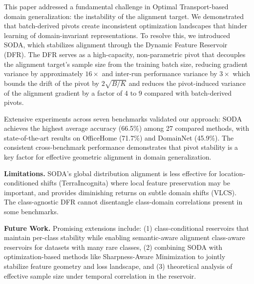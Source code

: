 \documentclass[preprint,12pt]{elsarticle}
\providecommand{\DIFadd}[1]{{\protect\color{blue} \sf #1}} %
\providecommand{\DIFdel}[1]{{\protect\color{red} \scriptsize #1}} %
\providecommand{\DIFaddbegin}{} %
\providecommand{\DIFaddend}{} %
\providecommand{\DIFdelbegin}{} %
\providecommand{\DIFdelend}{} %
\newcommand{\DIFscaledelfig}{0.5}
\newlength{\DIFdelgraphicswidth} %
\newlength{\DIFdelgraphicsheight} %
\newcommand{\DIFaddincludegraphics}[2][]{{\color{blue}\fbox{\DIFOincludegraphics[#1]{#2}}}} %
\newcommand{\DIFdelincludegraphics}[2][]{%
\sbox{\DIFdelgraphicsbox}{\DIFOincludegraphics[#1]{#2}}%
\settoboxwidth{\DIFdelgraphicswidth}{\DIFdelgraphicsbox} %
\settoboxtotalheight{\DIFdelgraphicsheight}{\DIFdelgraphicsbox} %
\scalebox{\DIFscaledelfig}{%
\parbox[b]{\DIFdelgraphicswidth}{\usebox{\DIFdelgraphicsbox}\\[-\baselineskip] \rule{\DIFdelgraphicswidth}{0em}}\llap{\resizebox{\DIFdelgraphicswidth}{\DIFdelgraphicsheight}{%
\setlength{\unitlength}{\DIFdelgraphicswidth}%
\begin{picture}(1,1)%
\thicklines\linethickness{2pt} %
{\color[rgb]{1,0,0}\put(0,0){\framebox(1,1){}}}%
{\color[rgb]{1,0,0}\put(0,0){\line( 1,1){1}}}%
{\color[rgb]{1,0,0}\put(0,1){\line(1,-1){1}}}%
\end{picture}%
}\hspace*{3pt}}} %
} %
\DeclareRobustCommand{\DIFaddbegin}{\DIFOaddbegin \let\includegraphics\DIFaddincludegraphics} %
\DeclareRobustCommand{\DIFaddend}{\DIFOaddend \let\includegraphics\DIFOincludegraphics} %
\DeclareRobustCommand{\DIFdelbegin}{\DIFOdelbegin \let\includegraphics\DIFdelincludegraphics} %
\DeclareRobustCommand{\DIFdelend}{\DIFOaddend \let\includegraphics\DIFOincludegraphics} %
\begin{document}
This paper addressed a fundamental challenge in Optimal Transport-based domain generalization: the instability of the alignment target. We demonstrated that batch-derived pivots create inconsistent optimization landscapes that hinder learning of domain-invariant representations. To resolve this, we introduced SODA, which stabilizes alignment through the Dynamic Feature Reservoir (DFR). The DFR serves as a high-capacity, non-parametric pivot that decouples the alignment target's sample size from the training batch size, \DIFdelbegin \DIFdel{reducing gradient variance by approximately $16\times$ and inter-run performance variance by $3\times$}\DIFdelend \DIFaddbegin \DIFadd{which bounds the drift of the pivot by $2\sqrt{B/K}$ and reduces the pivot-induced variance of the alignment gradient by a factor of 4 to 9 compared with batch-derived pivots}\DIFaddend .

Extensive experiments across seven benchmarks validated our approach: SODA achieves the highest average accuracy (66.5\%) among 27 compared methods, with state-of-the-art results on OfficeHome (71.7\%) and DomainNet (45.9\%). The consistent cross-benchmark performance demonstrates that pivot stability is a key factor for effective geometric alignment in domain generalization.

\textbf{Limitations.} SODA's global distribution alignment is less effective for location-conditioned shifts (TerraIncognita) where local feature preservation may be important, and provides diminishing returns on subtle domain shifts (VLCS). The class-agnostic DFR cannot disentangle class-domain correlations present in some benchmarks.

\textbf{Future Work.} Promising extensions include: (1) \DIFdelbegin \DIFdel{class-conditional reservoirs that maintain per-class stability while enabling semantic-aware alignment}\DIFdelend \DIFaddbegin \DIFadd{class-aware reservoirs for datasets with many rare classes}\DIFaddend , (2) combining SODA with optimization-based methods like Sharpness-Aware Minimization to jointly stabilize feature geometry and loss landscape, and (3) theoretical analysis of effective sample size under temporal correlation in the reservoir. 


\end{document}
